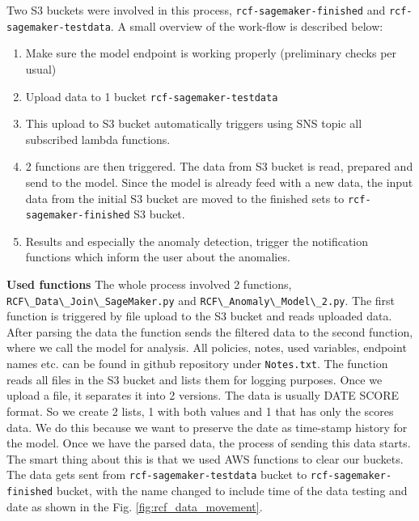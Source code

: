 Two S3 buckets were involved in this process, \verb|rcf-sagemaker-finished| and \verb|rcf-sagemaker-testdata|. A small overview of the work-flow is described below:
\begin{enumerate}
\item Make sure the model endpoint is working properly (preliminary checks per usual)
\item Upload data to 1 bucket \verb|rcf-sagemaker-testdata|
\item This upload to S3 bucket automatically triggers using SNS topic all subscribed lambda functions.
\item 2 functions are then triggered. The data from S3 bucket is read, prepared and send to the model. Since the model is already feed with a new data, the input data from the initial S3 bucket are moved to the finished sets to \verb|rcf-sagemaker-finished| S3 bucket.
\item Results and especially the anomaly detection, trigger the notification functions which inform the user about the anomalies.
\end{enumerate}

\textbf{Used functions}
The whole process involved 2 functions, \verb|RCF\_Data\_Join\_SageMaker.py| and \verb|RCF\_Anomaly\_Model\_2.py|. The first function is triggered by file upload to the S3 bucket and reads uploaded data. After parsing the data the function sends the filtered data to the second function, where we call the model for analysis.
All policies, notes, used variables, endpoint names etc. can be found in github repository under \verb|Notes.txt|.
The function reads all files in the S3 bucket and lists them for logging purposes. Once we upload a file, it separates it into 2 versions. The data is usually DATE SCORE format.
So we create 2 lists, 1 with both values and 1 that has only the scores data. We do this because we want to preserve the date as time-stamp history for the model.
Once we have the parsed data, the process of sending this data starts. The smart thing about this is that we used AWS functions to clear our buckets. The data gets sent from \verb|rcf-sagemaker-testdata| bucket to \verb|rcf-sagemaker-finished| bucket, with the name changed to include time of the data testing and date as shown in the Fig. \ref{fig:rcf_data_movement}.\\

